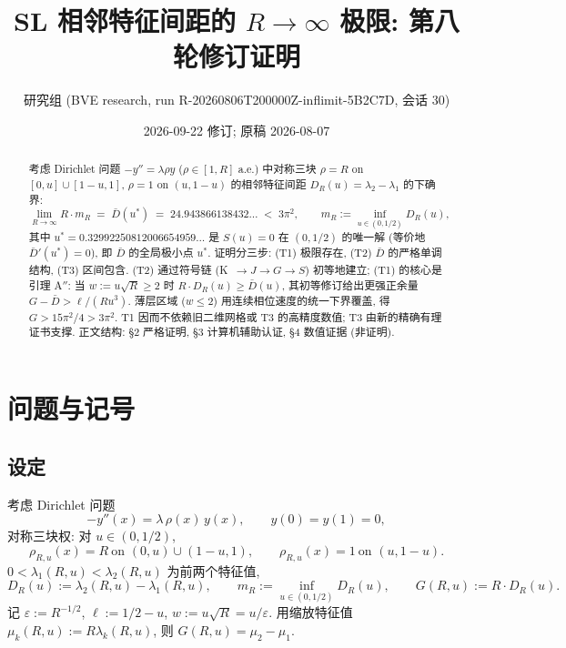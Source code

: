 \documentclass[UTF8]{ctexart}
\title{SL 相邻特征间距的 $R\to\infty$ 极限: 第八轮修订证明}
\author{研究组 (BVE research, run R-20260806T200000Z-inflimit-5B2C7D, 会话 30)}
\date{2026-09-22 修订; 原稿 2026-08-07}
\begin{document}
\maketitle

\begin{abstract}
考虑 Dirichlet 问题 $-y''=\lambda\rho y$ ($\rho\in[1,R]$ a.e.) 中对称三块
$\rho=R$ on $[0,u]\cup[1-u,1]$, $\rho=1$ on $(u,1-u)$ 的相邻特征间距
$D_R(u)=\lambda_2-\lambda_1$ 的下确界:
\begin{equation}
	\lim_{R\to\infty} R\cdot m_R \;=\; \bar D(u^*)\;=\; 24.943866138432\ldots
	\;<\; 3\pi^2,
	\qquad m_R:=\inf_{u\in(0,1/2)} D_R(u),
\end{equation}
其中 $u^*=0.32992250812006654959\ldots$ 是 $S(u)=0$ 在 $(0,1/2)$ 的唯一解
(等价地 $\bar D'(u^*)=0$), 即 $\bar D$ 的全局极小点 $u^*$.
证明分三步: (T1) 极限存在, (T2) $\bar D$ 的严格单调结构, (T3) 区间包含.
(T2) 通过符号链 (K~$\to J\to G\to S$) 初等地建立;
(T1) 的核心是引理 A$''$: 当 $w:=u\sqrt R\ge 2$ 时 $R\cdot D_R(u)\ge\bar D(u)$,
其初等修订给出更强正余量 $G-\bar D>\ell/(Ru^3)$.
薄层区域 ($w\le2$) 用连续相位速度的统一下界覆盖, 得 $G>15\pi^2/4>3\pi^2$.
T1 因而不依赖旧二维网格或 T3 的高精度数值; T3 由新的精确有理证书支撑.
正文结构: §2 严格证明, §3 计算机辅助认证, §4 数值证据 (非证明).
\end{abstract}

\tableofcontents

\section{问题与记号}

\subsection{设定}
考虑 Dirichlet 问题
\begin{equation}
	-y''(x)=\lambda\,\rho(x)\,y(x),\qquad y(0)=y(1)=0,
\end{equation}
对称三块权: 对 $u\in(0,1/2)$,
\begin{equation}
	\rho_{R,u}(x)=R\ \text{on }(0,u)\cup(1-u,1),\qquad
	\rho_{R,u}(x)=1\ \text{on }(u,1-u).
\end{equation}
$0<\lambda_1(R,u)<\lambda_2(R,u)$ 为前两个特征值,
\begin{equation}
	D_R(u):=\lambda_2(R,u)-\lambda_1(R,u),\qquad
	m_R:=\inf_{u\in(0,1/2)}D_R(u),\qquad
	G(R,u):=R\cdot D_R(u).
\end{equation}
记 $\varepsilon:=R^{-1/2}$, $\ell:=1/2-u$, $w:=u\sqrt R=u/\varepsilon$.
用缩放特征值 $\mu_k(R,u):=R\lambda_k(R,u)$, 则 $G(R,u)=\mu_2-\mu_1$.
\end{document}

